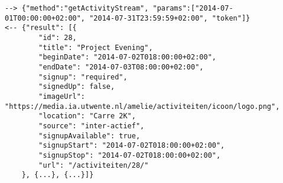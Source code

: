 \documentclass[a4paper]{scrreprt}
\begin{document}
\begin{enumerate}
\begin{lstlisting}
--> {"method":"getActivityStream", "params":["2014-07-01T00:00:00+02:00", "2014-07-31T23:59:59+02:00", "token"]}
<-- {"result": [{
        "id": 28,
        "title": "Project Evening",
        "beginDate": "2014-07-02T018:00:00+02:00",
        "endDate": "2014-07-03T08:00:00+02:00",
        "signup": "required",
        "signedUp": false,
        "imageUrl": "https://media.ia.utwente.nl/amelie/activiteiten/icoon/logo.png",
        "location": "Carre 2K",
        "source": "inter-actief",
        "signupAvailable": true,
        "signupStart": "2014-07-02T018:00:00+02:00",
        "signupStop": "2014-07-02T018:00:00+02:00",
        "url": "/activiteiten/28/"
    }, {...}, {...}]}
\end{lstlisting}
\end{enumerate}

\clearpage
\end{document}

